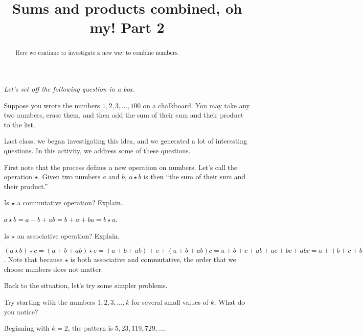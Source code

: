 \documentclass[handout,space,nooutcomes]{ximera}
\title{Sums and products combined, oh my!  Part 2}
\begin{document}
\begin{abstract}
Here we continue to investigate a new way to combine numbers.
\end{abstract}
\maketitle

\emph{Let's set off the following question in a box.} 

Suppose you wrote the numbers $1,2,3,\dots,100$ on a chalkboard. You
may take any two numbers, erase them, and then add the sum of their
sum and their product to the list.

Last class, we began investigating this idea, and we generated a lot of interesting questions.  
In this activity, we address some of these questions.  

First note that the process defines a new operation on numbers.  Let's call the operation $\star$.  Given two numbers $a$ and $b$,  $a\star b$ is then ``the sum of their sum and their product.''    

\begin{problem}
Is $\star$ a commutative operation?  Explain.  
\begin{freeResponse}
$a\star b = a+b+ab= b+a+ba = b\star a$.  
\end{freeResponse}
\end{problem}

\begin{problem}
Is $\star$ an associative operation?  Explain.  
\begin{freeResponse}
$(a\star b)\star c = (a+b+ab)\star c = (a+b+ab)+c + (a+b+ab)c 
= a + b + c + ab + ac + bc + abc = a+(b+c+bc) + a(b+c+bc) =
a\star (b+c+bc) = a \star(b\star c)$.  Note that because $\star$ is both associative 
and commutative, the order that we choose numbers does not matter.  
\end{freeResponse}
\end{problem}

Back to the situation, let's try some simpler problems.  

\begin{problem}
Try starting with the numbers $1,2,3,\dots, k$ for several small values of $k$.  What do you notice?  
\begin{freeResponse}
Beginning with $k = 2$, the pattern is $5, 23, 119, 729, \dots$.  
\end{freeResponse}
\end{problem}
\end{document}

